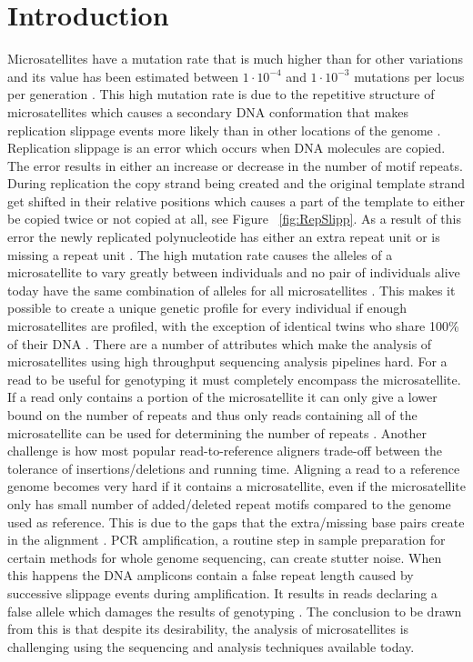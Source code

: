 \documentclass{bioinfo}
\begin{document}
\maketitle

\section{Introduction}
\label{s:intro}
Microsatellites have a mutation rate that is much higher than for other variations and its value has been estimated between $1 \cdot 10^{-4}$ and $1 \cdot 10^{-3}$ mutations per locus per generation \cite{sun2012direct}.
This high mutation rate is due to the repetitive structure of microsatellites which causes a secondary DNA conformation that makes replication slippage events more likely than in other locations of the genome \cite{Mirkin2007}. Replication slippage is an error which occurs when DNA molecules are copied. The error results in either an increase or decrease in the number of motif repeats. During replication the copy strand being created and the original template strand get shifted in their relative positions which causes a part of the template to either be copied twice or not copied at all, see Figure ~\ref{fig:RepSlipp}. As a result of this error the newly replicated polynucleotide has either an extra repeat unit or is missing a repeat unit \cite{Brown2002}.
The high mutation rate causes the alleles of a microsatellite to vary greatly between individuals \cite{sun2012direct} and no pair of individuals alive today have the same combination of alleles for all microsatellites \cite{Highnam2013}.
This makes it possible to create a unique genetic profile for every individual if enough microsatellites are profiled, with the exception of identical twins who share 100\% of their DNA \cite{NHGRI1999}.
There are a number of attributes which make the analysis of microsatellites using high throughput sequencing analysis pipelines hard. For a read to be useful for genotyping it must completely encompass the microsatellite. If a read only contains a portion of the microsatellite it can only give a lower bound on the number of repeats and thus only reads containing all of the microsatellite can be used for determining the number of repeats \cite{Gymrek2012}. Another challenge is how most popular read-to-reference aligners trade-off between the tolerance of insertions/deletions and running time.
Aligning a read to a reference genome becomes very hard if it contains a microsatellite, even if the microsatellite only has small number of added/deleted repeat motifs compared to the genome used as reference. This is due to the gaps that the extra/missing base pairs create in the alignment \cite{Li2010}. PCR amplification, a routine step in sample preparation for certain methods for whole genome sequencing, can create stutter noise. When this happens the DNA amplicons contain a false repeat length caused by successive slippage events during amplification. It results in reads declaring a false allele which damages the results of genotyping \cite{Ellegren2004}. The conclusion to be drawn from this is that despite its desirability, the analysis of microsatellites is challenging using the sequencing and analysis techniques available today.
\end{document}
